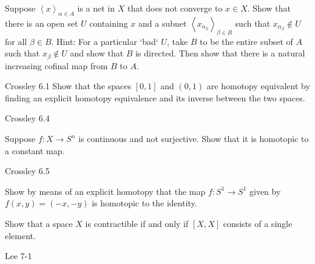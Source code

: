 \documentclass{homework651}
\begin{document}
\begin{problems}
\problem Suppose $\left<x\right>_{\alpha\in A}$ is a net
in $X$ that does not converge to $x\in X$.  Show that
there is an open set $U$ containing $x$ and a subnet
$\left<x_{\alpha_\beta}\right>_{\beta\in B}$ such that
$x_{\alpha_{\beta}}\not\in U$ for all $\beta\in B$.
Hint: For a particular `bad` $U$, 
take $B$ to be the entire subset of $A$ such that
$x_{\beta}\not\in U$ and show that $B$ is directed.
Then show that there is a natural increasing cofinal map
from $B$ to $A$.


\problem Crossley 6.1
Show that the spaces $[0,1]$ and $(0,1)$ are homotopy equivalent
by finding an explicit homotopy equivalence and its inverse 
between the two spaces.

\problem Crossley 6.4

Suppose $f:X\rightarrow S^n$ is continuous and not surjective.
Show that it is homotopic to a constant map.

\problem Crossley 6.5

Show by means of an explicit homotopy
that the map $f:S^1\rightarrow S^1$ given by $f(x,y)=(-x,-y)$
is homotopic to the identity.

\problem Show that a space $X$ is contractible if and only if 
$[X,X]$ consists of a single element.

\problem Lee 7-1


\end{problems}
\end{document}
